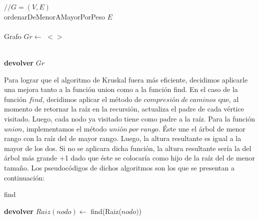 \begin{itemize}
\begin{algorithm}[H]
    $//G = (V,E)$ \\
    ordenarDeMenorAMayorPorPeso $E$\\  
    \\ 
    Grafo $Gr \leftarrow$ $<>$\\
	\\

	\textbf{devolver} $Gr$
\end{algorithm}

\newline
Para lograr que el algoritmo de Kruskal fuera más eficiente, decidimos aplicarle una mejora tanto a la función union como a la función find.\newline
\newline
En el caso de la función $find$, decidimos aplicar el método de $compresión\ de\ caminos$ que, al momento de retornar la raíz en la recursión, actualiza el padre de cada vértice visitado. Luego, cada nodo ya visitado tiene como padre a la raíz.\newline
\newline
Para la función $union$, implementamos el método $unión\ por\ rango$. Éste une el árbol de menor rango con la raíz del de mayor rango. Luego, la altura resultante es igual a la mayor de los dos. Si no se aplicara dicha función, la altura resultante sería la del árbol más grande +1 dado que éste se colocaría como hijo de la raíz del de menor tamaño. \newline
\newline
Los pseudocódigos de dichos algoritmos son los que se presentan a continuación:\newline
\newline
\begin{algorithm}[H]
	\SetAlgoLined
	\caption{find}
    
	\textbf{devolver} $Raiz(nodo) \leftarrow$ find(Raiz($nodo)$)
\end{algorithm}


\end{itemize}
